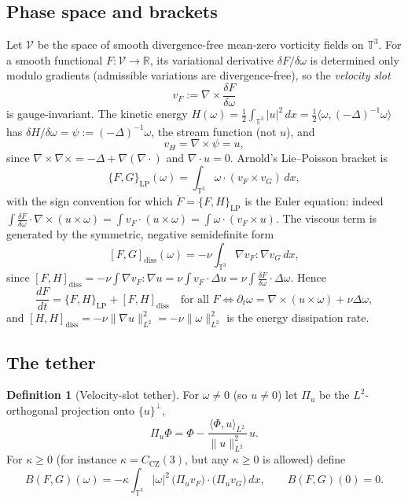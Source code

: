 \documentclass[11pt,reqno]{amsart}
\theoremstyle{definition}
\newtheorem{definition}[lemma]{Definition}
\theoremstyle{remark}
\newcommand{\T}{\mathbb{T}^3}
\newcommand{\R}{\mathbb{R}}
\newcommand{\norm}[1]{\lVert #1\rVert}
\newcommand{\abs}[1]{\lvert #1\rvert}
\newcommand{\ip}[2]{\langle #1,#2\rangle}
\newcommand{\curl}{\nabla\times}
\newcommand{\Pu}{\Pi_u}
\begin{document}
\subsection{Phase space and brackets}
Let $\mathcal V$ be the space of smooth divergence-free mean-zero vorticity fields on $\T$. For a smooth functional $F:\mathcal V\to\R$, its variational derivative $\delta F/\delta\omega$ is determined only modulo gradients (admissible variations are divergence-free), so the \emph{velocity slot}
\[
v_F:=\curl\frac{\delta F}{\delta\omega}
\]
is gauge-invariant. The kinetic energy $H(\omega)=\tfrac12\int_{\T}\abs{u}^2\,dx=\tfrac12\ip{\omega}{(-\Delta)^{-1}\omega}$ has $\delta H/\delta\omega=\psi:=(-\Delta)^{-1}\omega$, the stream function (not $u$), and
\begin{equation}\label{eq:vH}
v_H=\curl\psi=u,
\end{equation}
since $\curl\curl=-\Delta+\nabla(\nabla\cdot)$ and $\nabla\cdot u=0$. Arnold's Lie--Poisson bracket \cite{Arnold1966} is
\[
\{F,G\}_{\mathrm{LP}}(\omega)=\int_{\T}\omega\cdot(v_F\times v_G)\,dx,
\]
with the sign convention for which $\dot F=\{F,H\}_{\mathrm{LP}}$ is the Euler equation: indeed $\int\frac{\delta F}{\delta\omega}\cdot\curl(u\times\omega)=\int v_F\cdot(u\times\omega)=\int\omega\cdot(v_F\times u)$. The viscous term is generated by the symmetric, negative semidefinite form
\[
[F,G]_{\mathrm{diss}}(\omega)=-\nu\int_{\T}\nabla v_F:\nabla v_G\,dx,
\]
since $[F,H]_{\mathrm{diss}}=-\nu\int\nabla v_F:\nabla u=\nu\int v_F\cdot\Delta u=\nu\int\frac{\delta F}{\delta\omega}\cdot\Delta\omega$. Hence
\begin{equation}\label{eq:NSbracket}
\frac{dF}{dt}=\{F,H\}_{\mathrm{LP}}+[F,H]_{\mathrm{diss}}\quad\text{for all }F\iff\partial_t\omega=\curl(u\times\omega)+\nu\Delta\omega,
\end{equation}
and $[H,H]_{\mathrm{diss}}=-\nu\norm{\nabla u}_{L^2}^2=-\nu\norm{\omega}_{L^2}^2$ is the energy dissipation rate.

\subsection{The tether}
\begin{definition}[Velocity-slot tether]\label{def:tether}
For $\omega\neq0$ (so $u\neq0$) let $\Pu$ be the $L^2$-orthogonal projection onto $\{u\}^\perp$,
\[
\Pu\Phi=\Phi-\frac{\ip{\Phi}{u}_{L^2}}{\norm{u}_{L^2}^2}\,u .
\]
For $\kappa\ge0$ (for instance $\kappa=C_{\mathrm{CZ}}(3)$, but any $\kappa\ge0$ is allowed) define
\[
B(F,G)(\omega)=-\kappa\int_{\T}\abs{\omega}^2\,\bigl(\Pu v_F\bigr)\cdot\bigl(\Pu v_G\bigr)\,dx,\qquad B(F,G)(0)=0 .
\]
\end{definition}
\end{document}
